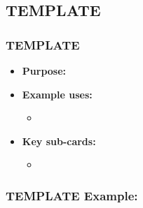 \subsection{TEMPLATE}

\begin{frame}\frametitle{TEMPLATE}

\begin{itemize}
\item[] \textbf{Purpose:} 
\item[] \textbf{Example uses:}
\begin{itemize}
  \item 
\end{itemize}
\item[] \textbf{Key sub-cards:}
\begin{itemize}
  \item[] \verb||
\end{itemize}
\end{itemize}

\end{frame}

\begin{frame}[fragile]\frametitle{TEMPLATE Example: }

\begin{semiverbatim}
\end{semiverbatim}

\end{frame}

